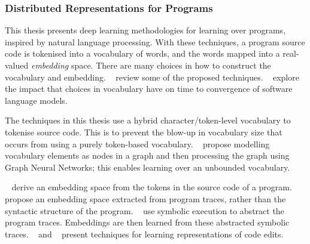 \subsubsection{Distributed Representations for Programs}

This thesis presents deep learning methodologies for learning over programs, inspired by natural language processing. With these techniques, a program source code is tokenised into a vocabulary of words, and the words mapped into a real-valued \emph{embedding} space.
There are many choices in how to construct the vocabulary and embedding. \citeauthor{Chen2019}~\cite{Chen2019} review some of the proposed techniques.
\citeauthor{Babii}~\cite{Babii} explore the impact that choices in vocabulary have on time to convergence of software language models.

The techniques in this thesis use a hybrid character/token-level vocabulary to tokenise source code. This is to prevent the blow-up in vocabulary size that occurs from using a purely token-based vocabulary. \citeauthor{Cvitkovic2018a}~\cite{Cvitkovic2018a} propose modelling vocabulary elements as nodes in a graph and then processing the graph using Graph Neural Networks; this enables learning over an unbounded vocabulary.

\citeauthor{Mou2016}~\cite{Mou2016} derive an embedding space from the tokens in the source code of a program.
\citeauthor{Wang2017d}~\cite{Wang2017d} propose an embedding space extracted from program traces, rather than the syntactic structure of the program.
\citeauthor{Henkel2018}~\cite{Henkel2018} use symbolic execution to abstract the program traces. Embeddings are then learned from these abstracted symbolic traces.
%
\citeauthor{Yin2018}~\cite{Yin2018} and \citeauthor{Tufano2019}~\cite{Tufano2019} present techniques for learning representations of code edits.


